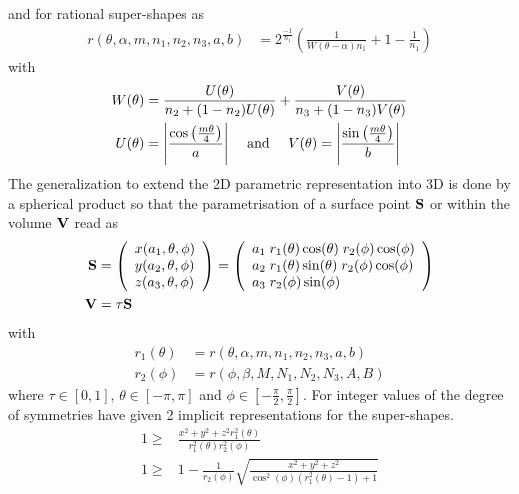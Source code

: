and for rational super-shapes \cite{Blanc1996,Fougerolle2007} as
\begin{align}\label{eq:rationalsupershapes:parametric_r}
  r(\theta,\alpha,m,n_1,n_2,n_3,a,b) &= 2^{\frac{-1}{n_1}} \left(\frac{1}{W(\theta-\alpha)n_1}+1-\frac{1}{n_1}\right)
\end{align}
with
\begin{align}
  W(\theta) &= \frac{U(\theta)}{n_2+(1-n_2)U(\theta)} + \frac{V(\theta)}{n_3+(1-n_3)V(\theta)} \\
  U(\theta)&= \abs{\frac{\cos\left(\frac{m\theta}{4}\right)}{a}} \quad \mbox{~and~}\quad  V(\theta)= \abs{\frac{\sin\left(\frac{m\theta}{4}\right)}{b}}
\end{align}
The generalization to extend the 2D parametric representation into 3D is done by a spherical product so that the parametrisation of a surface point $\B{S}$ or within the volume $\B{V}$ read as
\begin{align}\label{eq:supershapes:parametric}
\B{S} &=\left(
    \begin{array}{l}
      x(a_1,\theta,\phi) \\
      y(a_2,\theta,\phi) \\
      z(a_3,\theta,\phi) \\
    \end{array}
  \right)
 =
 \left(
    \begin{array}{l}
     a_1 \; r_1(\theta) \cos(\theta) \; r_2(\phi) \cos(\phi)  \\
     a_2 \; r_1(\theta) \sin(\theta) \; r_2(\phi) \cos(\phi)  \\
     a_3 \; r_2(\phi)   \sin(\phi) \\
    \end{array}
  \right) \\
 \B{V} &= \tau  \B{S}
\end{align}
with
\begin{align} \label{eq:supershapes:parametric_r1}
r_1(\theta) &= r(\theta,\alpha,m,n_1,n_2,n_3,a,b) \\
\label{eq:supershapes:parametric_r2}
r_2(\phi)   &= r(\phi,  \beta, M,N_1,N_2,N_3,A,B)
\end{align}
where $\tau\in[0,1]$, $\theta\in[-\pi,\pi]$ and $\phi\in\left[-\frac{\pi}{2},\frac{\pi}{2}\right]$.
For integer values of the degree of symmetries \cite{Fougerolle2005,Fougerolle2005a,Fougerolle2006,Fougerolle2007} have given 2 implicit representations for the super-shapes.
\begin{align}\label{eq:SuperShapesImplicit}
1 \geq&  \frac{x^2+y^2+z^2r_1^2(\theta)}{r_1^2(\theta)r_2^2(\phi)}  \\
1 \geq&  1-\frac{1}{r_2(\phi)} \sqrt{\frac{x^2+y^2+z^2}{\cos^2(\phi)\left(r_1^2(\theta)-1\right)+1}}
\end{align}
